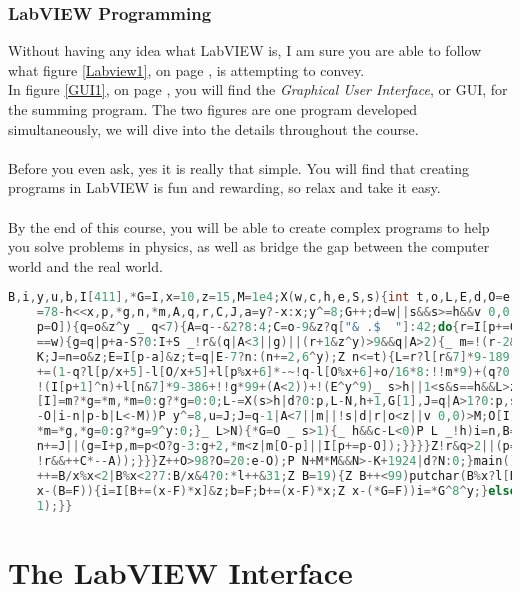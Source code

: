 	\subsubsection{LabVIEW Programming}
	Without having any idea what LabVIEW is, I am sure you are able to follow what figure \ref{Labview1}, on page \pageref{Labview1}, is attempting to convey.\\
	In figure \ref{GUI1}, on page \pageref{GUI1}, you will find the \textit{Graphical User Interface}, or GUI, for the summing program. The two figures are one program developed simultaneously, we will dive into the details throughout the course.\\
	\\
	Before you even ask, yes it is really that simple. You will find that creating programs in LabVIEW is fun and rewarding, so relax and take it easy.\\
	\\
	By the end of this course, you will be able to create complex programs to help you solve problems in physics, as well as bridge the gap between the computer world and the real world.\\  

	{\tiny
	\begin{lstlisting}[language=C, caption=This listing is executable C code \cite{tinychess}, label=tinychess]
	B,i,y,u,b,I[411],*G=I,x=10,z=15,M=1e4;X(w,c,h,e,S,s){int t,o,L,E,d,O=e,N=-M*M,K
	=78-h<<x,p,*g,n,*m,A,q,r,C,J,a=y?-x:x;y^=8;G++;d=w||s&&s>=h&&v 0,0)>M;do{_ o=I[
	p=O]){q=o&z^y _ q<7){A=q--&2?8:4;C=o-9&z?q["& .$  "]:42;do{r=I[p+=C[l]-64]_!w|p
	==w){g=q|p+a-S?0:I+S _!r&(q|A<3||g)||(r+1&z^y)>9&&q|A>2){_ m=!(r-2&7))P G[1]=O,
	K;J=n=o&z;E=I[p-a]&z;t=q|E-7?n:(n+=2,6^y);Z n<=t){L=r?l[r&7]*9-189-h-q:0 _ s)L
	+=(1-q?l[p/x+5]-l[O/x+5]+l[p%x+6]*-~!q-l[O%x+6]+o/16*8:!!m*9)+(q?0:!(I[p-1]^n)+
	!(I[p+1]^n)+l[n&7]*9-386+!!g*99+(A<2))+!(E^y^9)_ s>h||1<s&s==h&&L>z|d){p[I]=n,O
	[I]=m?*g=*m,*m=0:g?*g=0:0;L-=X(s>h|d?0:p,L-N,h+1,G[1],J=q|A>1?0:p,s)_!(h||s-1|B
	-O|i-n|p-b|L<-M))P y^=8,u=J;J=q-1|A<7||m||!s|d|r|o<z||v 0,0)>M;O[I]=o;p[I]=r;m?
	*m=*g,*g=0:g?*g=9^y:0;}_ L>N){*G=O _ s>1){_ h&&c-L<0)P L _!h)i=n,B=O,b=p;}N=L;}
	n+=J||(g=I+p,m=p<O?g-3:g+2,*m<z|m[O-p]||I[p+=p-O]);}}}}Z!r&q>2||(p=O,q|A>2|o>z&
	!r&&++C*--A));}}}Z++O>98?O=20:e-O);P N+M*M&&N>-K+1924|d?N:0;}main(){Z++B<121)*G
	++=B/x%x<2|B%x<2?7:B/x&4?0:*l++&31;Z B=19){Z B++<99)putchar(B%x?l[B[I]|16]:x)_
	x-(B=F)){i=I[B+=(x-F)*x]&z;b=F;b+=(x-F)*x;Z x-(*G=F))i=*G^8^y;}else v u,5);v u,
	1);}}
	\end{lstlisting}
	}
	\section{The LabVIEW Interface}
